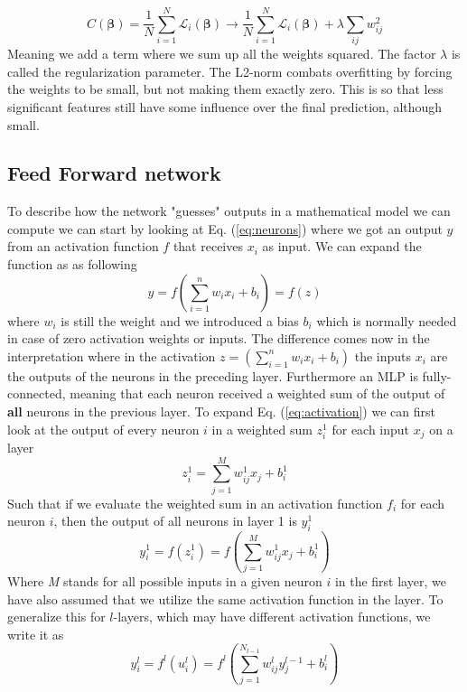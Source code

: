 \documentclass[14pt, a4paper]{book}
\begin{document}
\begin{equation}\label{eq:reg}
    C(\bm\beta)=\frac{1}{N}\sum_{i=1}^N\mathcal{L}_i(\bm\beta)\rightarrow \frac{1}{N}\sum_{i=1}^N\mathcal{L}_i(\bm\beta)+\lambda\sum_{ij}w_{ij}^2
\end{equation}
Meaning we add a term where we sum up all the weights squared. The factor $\lambda$ is called the regularization parameter. The L2-norm combats overfitting by forcing the weights to be small, but not making them exactly zero. This is so that less significant features still have some influence over the final prediction, although small.


\subsection{Feed Forward network}
To describe how the network "guesses" outputs in a mathematical model we can compute we can start by looking at Eq. (\ref{eq:neurons}) where we got an output $y$ from an activation function $f$ that receives $x_i$ as input. We can expand the function as as following
\begin{equation}\label{eq:activation}
    y=f\left(\sum_{i=1}^nw_ix_i+b_i\right)=f(z)
\end{equation} 
where $w_i$ is still the weight and we introduced a bias $b_i$ which is normally needed in case of zero activation weights or inputs. The difference comes now in the interpretation where in the activation $z=(\sum_{i=1}^nw_ix_i+b_i)$ the inputs $x_i$ are the outputs of the neurons in the preceding layer. Furthermore an MLP is fully-connected, meaning that each neuron received a weighted sum of the output of \textbf{all} neurons in the previous layer. To expand Eq. (\ref{eq:activation}) we can first look at the output of every neuron $i$ in a weighted sum $z^1_i$ for each input $x_j$ on a layer
\begin{equation}\label{eq:weightedsum}
    z_i^1=\sum_{j=1}^Mw_{ij}^1x_j + b^1_i
\end{equation}
Such that if we evaluate the weighted sum in an activation function $f_i$ for each neuron $i$, then the output of all neurons in layer 1 is $y_i^1$
$$
    y^1_i=f(z_i^1)=f\left(\sum_{j=1}^Mw_{ij}^1x_j + b^1_i\right)
$$
Where \textit{M} stands for all possible inputs in a given neuron $i$ in the first layer, we have also assumed that we utilize the same activation function in the layer. To generalize this for $l$-layers, which may have different activation functions, we write it as
$$
    y^l_i=f^l(u_i^l)=f^l\left(\sum_{j=1}^{N_{l-1}}w_{ij}^ly^{l-1}_j + b^l_i\right)
$$
\end{document}
